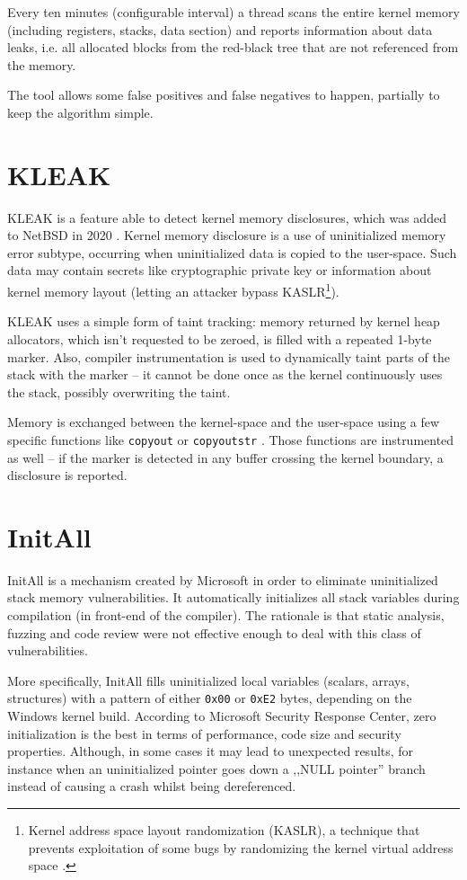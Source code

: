 \documentclass[shortabstract, manyadvisors, english, mgr]{iithesis}
\theoremstyle{definition} \newtheorem*{definition}{Definicja}
\theoremstyle{definition} \newtheorem*{example}{Przykład}
\theoremstyle{definition} \newtheorem*{remark}{Uwaga}
\begin{document}
Every ten minutes (configurable interval) a thread scans the entire kernel memory (including registers, stacks, data section) and reports information about data leaks, i.e. all allocated blocks from the red-black tree that are not referenced from the memory.

The tool allows some false positives and false negatives to happen, partially to keep the algorithm simple.
\section{KLEAK}
KLEAK \cite{bib:kleak-paper} is a feature able to detect kernel memory disclosures, which was added to NetBSD in 2020 \cite{bib:netbsd-9-notes}. Kernel memory disclosure is a use of uninitialized memory error subtype, occurring when uninitialized data is copied to the user-space. Such data may contain secrets like cryptographic private key or information about kernel memory layout (letting an attacker bypass KASLR\footnote{Kernel address space layout randomization (KASLR), a technique that prevents exploitation of some bugs by randomizing the kernel virtual address space \cite{bib:lwn-kaslr}.}).

KLEAK uses a simple form of taint tracking: memory returned by kernel heap allocators, which isn't requested to be zeroed, is filled with a repeated 1-byte marker. Also, compiler instrumentation is used to dynamically taint parts of the stack with the marker -- it cannot be done once as the kernel continuously uses the stack, possibly overwriting the taint.

Memory is exchanged between the kernel-space and the user-space using a few specific functions like \texttt{copyout} or \texttt{copyoutstr} \cite{bib:copy-bsd}. Those functions are instrumented as well -- if the marker is detected in any buffer crossing the kernel boundary, a disclosure is reported.

\section{InitAll}
InitAll \cite{bib:initall} is a mechanism created by Microsoft in order to eliminate uninitialized stack memory vulnerabilities. It automatically initializes all stack variables during compilation (in front-end of the compiler). The rationale is that static analysis, fuzzing and code review were not effective enough to deal with this class of vulnerabilities.

More specifically, InitAll fills uninitialized local variables (scalars, arrays, structures) with a pattern of either \texttt{0x00} or \texttt{0xE2} bytes, depending on the Windows kernel build. According to Microsoft Security Response Center, zero initialization is the best in terms of performance, code size and security properties. Although, in some cases it may lead to unexpected results, for instance when an uninitialized pointer goes down a ,,NULL pointer'' branch instead of causing a crash whilst being dereferenced.
\end{document}
